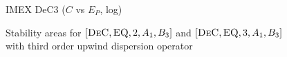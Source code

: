 \begin{example}
\begin{figure}[!h]
\begin{minipage}[t]{0.32\textwidth}
			IMEX DeC3 ($C$ vs $E_P$, log)
		\end{minipage}
		\caption{Stability areas for $[\textsc{DeC}, \textsc{EQ},2,A_1, B_3]$ and $[\textsc{DeC}, \textsc{EQ},3,A_1, B_3]$  with third order upwind dispersion operator}
		\label{fig: disp_IIMEXDeC2/3_GLB_CvsE_upwind}
	\end{figure}
\end{example}
